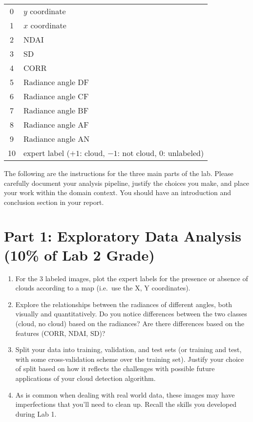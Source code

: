 \documentclass[letterpaper,12pt]{article}
\begin{document}
{\centering
\begin{tabular}{c|l}
    0 & $y$ coordinate \\
    1 & $x$ coordinate \\
    2 & NDAI \\
    3 & SD \\
    4 & CORR \\
    5 & Radiance angle DF \\
    6 & Radiance angle CF \\
    7 & Radiance angle BF \\
    8 & Radiance angle AF \\
    9 & Radiance angle AN \\\hline
    10 & expert label ($+1$: cloud, $-1$: not cloud, $0$: unlabeled) \\
\end{tabular}\par
}

The following are the instructions for the three main parts of the lab. Please carefully document your analysis pipeline, justify the choices you make, and place your work within the domain context. You should have an introduction and conclusion section in your report.

\section*{Part 1: Exploratory Data Analysis (10\% of Lab 2 Grade)}
\begin{enumerate}
    \item For the 3 labeled images, plot the expert labels for the presence or absence of clouds according to a map (i.e.~use the X, Y coordinates).
    \item Explore the relationships between the radiances of different angles, both visually and quantitatively. Do you notice differences between the two classes (cloud, no cloud) based on the radiances? Are there differences based on the features (CORR, NDAI, SD)?
    \item Split your data into training, validation, and test sets (or training and test, with some cross-validation scheme over the training set). Justify your choice of split based on how it reflects the challenges with possible future applications of your cloud detection algorithm.
    \item As is common when dealing with real world data, these images may have imperfections that you'll need to clean up. Recall the skills you developed during Lab 1.
\end{enumerate}
\end{document}
